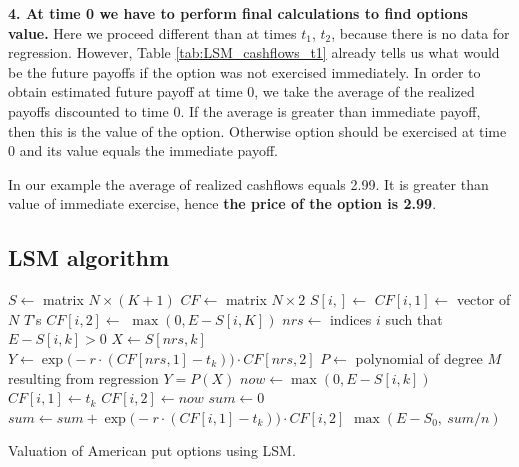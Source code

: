 \documentclass[a4paper,11pt, twoside]{book}
\theoremstyle{definition}
\theoremstyle{remark}
\begin{document}
\noindent \textbf{4. At time 0 we have to perform final calculations to find options value.} Here we proceed different than at times $t_1$, $t_2$, because there is no data for regression. However, Table \ref{tab:LSM_cashflows_t1} already tells us what would be the future payoffs if the option was not exercised immediately. In order to obtain estimated future payoff at time 0, we take the average of the realized payoffs discounted to time 0. If the average is greater than immediate payoff, then this is the value of the option. Otherwise option should be exercised at time 0 and its value equals the immediate payoff.

In our example the average of realized cashflows equals 2.99. It is greater than value of immediate exercise, hence \textbf{the price of the option is 2.99}.

\FloatBarrier
\subsection{LSM algorithm}
\begin{algorithm}
 \begin{algorithmic}[1]
    \State $S \gets$ matrix $N \times (K+1)$ 
    \State $CF \gets$ matrix $N \times 2$ 
     
      \State $S[i,] \gets$  
      \State $CF[i,1] \gets$ vector of $N$ $T$'s 
      \State $CF[i,2] \gets$ $\max(0, E - S[i,K])$ 
    \EndFor
      \State $nrs \gets $ indices $i$ such that $E - S[i,k] > 0$
      \State $X \gets S[nrs, k]$
      \State $Y \gets \exp\bigl(-r\cdot(CF[nrs, 1]-t_k) \bigr)\cdot CF[nrs, 2]$
      \State $P \gets $ polynomial of degree $M$ resulting from regression $Y = P(X)$
	\State $now \gets \max(0, E - S[i,k])$
	  \State $CF[i,1] \gets t_k$ 
	  \State $CF[i,2] \gets now$ 
	\EndIf
      \EndFor
    \EndFor
    \State $sum \gets 0$
      \State $sum \gets sum + \exp\bigl(-r\cdot(CF[i, 1]-t_k) \bigr)\cdot CF[i, 2]$
    \EndFor
    \State \Return $\max(E - S_0,\ sum/n)$
    \EndFunction 
 \end{algorithmic}
 \caption{Valuation of American put options using LSM.}
 \label{alg:LSM}
\end{algorithm}
\end{document}
